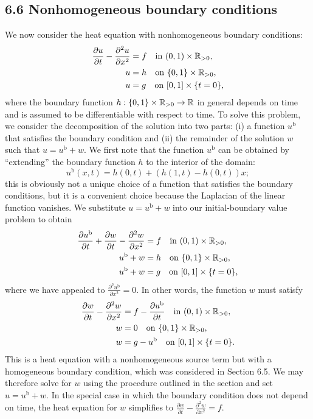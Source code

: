 \subsection{6.6 Nonhomogeneous boundary conditions}
We now consider the heat equation with nonhomogeneous boundary conditions:
\begin{align*}
    \frac{\partial u}{\partial t} - \frac{\partial^2 u}{\partial x^2} &= f \quad \text{in } (0, 1) \times \mathbb{R}_{>0}, \\
    u &= h \quad \text{on } \{0, 1\} \times \mathbb{R}_{>0}, \\
    u &= g \quad \text{on } [0, 1] \times \{t = 0\},
\end{align*}
where the boundary function $h : \{0, 1\} \times \mathbb{R}_{>0} \to \mathbb{R}$ in general depends on time and is assumed to be differentiable with respect to time. To solve this problem, we consider the decomposition of the solution into two parts: (i) a function $u^{\mathrm{b}}$ that satisfies the boundary condition and (ii) the remainder of the solution $w$ such that $u = u^{\mathrm{b}} + w$. We first note that the function $u^{\mathrm{b}}$ can be obtained by ``extending'' the boundary function $h$ to the interior of the domain:
\[u^{\mathrm{b}}(x, t) = h(0, t) + (h(1, t) - h(0, t)) x;\]
this is obviously not a unique choice of a function that satisfies the boundary conditions, but it is a convenient choice because the Laplacian of the linear function vanishes. We substitute $u = u^{\mathrm{b}} + w$ into our initial-boundary value problem to obtain
\begin{align*}
    \frac{\partial u^{\mathrm{b}}}{\partial t} + \frac{\partial w}{\partial t} - \frac{\partial^2 w}{\partial x^2} &= f \quad \text{in } (0, 1) \times \mathbb{R}_{>0}, \\
    u^{\mathrm{b}} + w &= h \quad \text{on } \{0, 1\} \times \mathbb{R}_{>0}, \\
    u^{\mathrm{b}} + w &= g \quad \text{on } [0, 1] \times \{t = 0\},
\end{align*}
where we have appealed to $\frac{\partial^2 u^{\mathrm{b}}}{\partial x^2} = 0$. In other words, the function $w$ must satisfy
\begin{align*}
    \frac{\partial w}{\partial t} - \frac{\partial^2 w}{\partial x^2} &= f - \frac{\partial u^{\mathrm{b}}}{\partial t} \quad \text{in } (0, 1) \times \mathbb{R}_{>0}, \\
    w &= 0 \quad \text{on } \{0, 1\} \times \mathbb{R}_{>0}, \\
    w &= g - u^{\mathrm{b}} \quad \text{on } [0, 1] \times \{t = 0\}.
\end{align*}
This is a heat equation with a nonhomogeneous source term but with a homogeneous boundary condition, which was considered in Section 6.5. We may therefore solve for $w$ using the procedure outlined in the section and set $u = u^{\mathrm{b}} + w$. In the special case in which the boundary condition does not depend on time, the heat equation for $w$ simplifies to $\frac{\partial w}{\partial t} - \frac{\partial^2 w}{\partial x^2} = f$.

